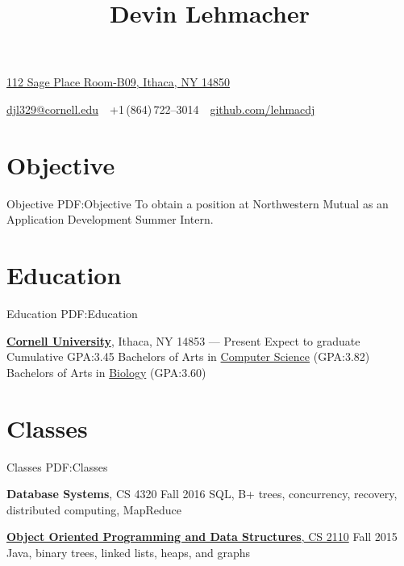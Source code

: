 \documentclass[letterpaper,10pt,oneside]{simpleresume}
\newcommand{\CVAuthor}{Devin Lehmacher}
\newcommand{\CVCompany}{Northwestern Mutual}
\newcommand{\CVWebpage}{github.com/lehmacdj}
\begin{document}
\begin{minipage}[t][0pt]{\linewidth}
\pagestyle{empty}

\title{\CVAuthor}

\begin{subtitle}
\href{https://www.google.com/maps/place/112+Sage+Pl+Room-B09,+Ithaca,+NY+14850}
{112 Sage Place Room-B09, Ithaca, NY 14850}
\par
\href{mailto:djl329@cornell.edu}
{djl329@cornell.edu}
\,\SubBulletSymbol\,
+1\,(864)\,722--3014
\,\SubBulletSymbol\,
\href{https://\CVWebpage}
{\CVWebpage}
\end{subtitle}

\begin{body}

\section%
{Objective}
{Objective}
{PDF:Objective}
To obtain a position at \CVCompany{} as an Application Development Summer
Intern.

\section%
{Education}
{Education}
{PDF:Education}

\href{https://www.cornell.edu}
{\textbf{Cornell University}},
Ithaca, NY 14853
\hfill
{} --- Present
\BulletItem%
Expect to graduate 
\BulletItem%
Cumulative GPA:\@ 3.45
\BulletItem%
Bachelors of Arts in
\href{https://www.cs.cornell.edu}{Computer Science}
(GPA:\@ 3.82)
\BulletItem%
Bachelors of Arts in
\href{https://www.biology.cornell.edu}{Biology}
(GPA:\@ 3.60)

\section%
{Classes}
{Classes}
{PDF:Classes}

\textbf{Database Systems}, CS 4320
\hfill Fall 2016
\BulletItem%
SQL, B+ trees, concurrency, recovery, distributed computing, MapReduce

\href{https://www.cs.cornell.edu/courses/cs2110/2015fa/}
{\textbf{Object Oriented Programming and Data Structures}, CS 2110}
\hfill Fall 2015
\BulletItem%
Java, binary trees, linked lists, heaps, and graphs


\end{body}
\end{minipage}
\end{document}

